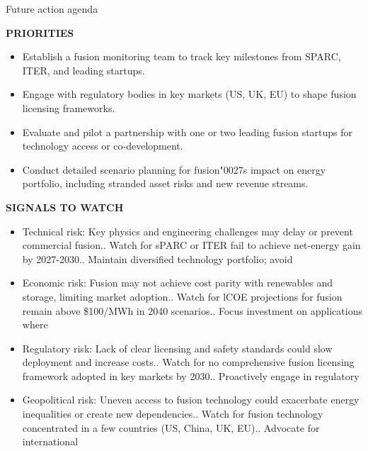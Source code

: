 \documentclass[10pt,a4paper]{article}
\newcommand{\BOApos}{{\BOQuoteFont\char"0027}}
\begin{document}
\clearpage
{\sffamily\fontsize{21}{26}\selectfont\color{BONavy} Future action agenda}\par\vspace{7pt}
\begin{minipage}[t]{0.47\linewidth}
{\textcolor{BOGreen}{\scriptsize\bfseries PRIORITIES}}\par\vspace{3pt}
{\small\begin{itemize}
\item Establish a fusion monitoring team to track key milestones from SPARC, ITER, and leading startups.
\item Engage with regulatory bodies in key markets (US, UK, EU) to shape fusion licensing frameworks.
\item Evaluate and pilot a partnership with one or two leading fusion startups for technology access or co-development.
\item Conduct detailed scenario planning for fusion\BOApos{}s impact on energy portfolio, including stranded asset risks and new revenue streams.
\end{itemize}}
\end{minipage}\hfill\begin{minipage}[t]{0.45\linewidth}
{\textcolor{BOGreen}{\scriptsize\bfseries SIGNALS TO WATCH}}\par\vspace{3pt}
{\small\begin{itemize}
\item Technical risk: Key physics and engineering challenges may delay or prevent commercial fusion.. Watch for sPARC or ITER fail to achieve net-energy gain by 2027-2030.. Maintain diversified technology portfolio; avoid
\item Economic risk: Fusion may not achieve cost parity with renewables and storage, limiting market adoption.. Watch for lCOE projections for fusion remain above \$100/MWh in 2040 scenarios.. Focus investment on applications where
\item Regulatory risk: Lack of clear licensing and safety standards could slow deployment and increase costs.. Watch for no comprehensive fusion licensing framework adopted in key markets by 2030.. Proactively engage in regulatory
\item Geopolitical risk: Uneven access to fusion technology could exacerbate energy inequalities or create new dependencies.. Watch for fusion technology concentrated in a few countries (US, China, UK, EU).. Advocate for international
\end{itemize}}
\end{minipage}
\end{document}
